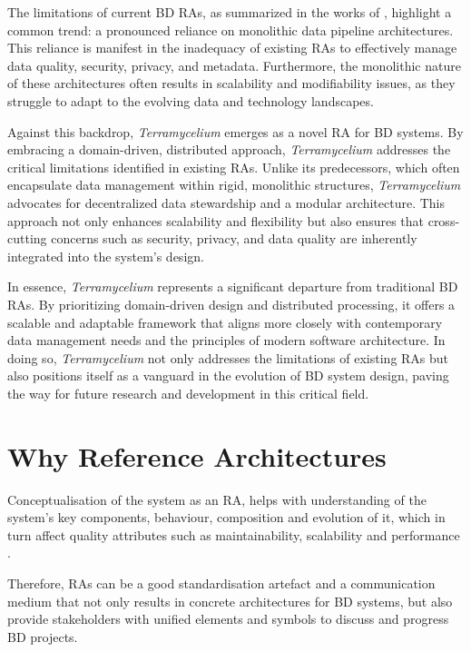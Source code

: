 \documentclass[preprint,12pt]{elsarticle}
\begin{document}
The limitations of current BD RAs, as summarized in the works of \citeauthor{ataei2022state}, highlight a common trend: a pronounced reliance on monolithic data pipeline architectures. This reliance is manifest in the inadequacy of existing RAs to effectively manage data quality, security, privacy, and metadata. Furthermore, the monolithic nature of these architectures often results in scalability and modifiability issues, as they struggle to adapt to the evolving data and technology landscapes.

Against this backdrop, \textit{Terramycelium} emerges as a novel RA for BD systems. By embracing a domain-driven, distributed approach, \textit{Terramycelium} addresses the critical limitations identified in existing RAs. Unlike its predecessors, which often encapsulate data management within rigid, monolithic structures, \textit{Terramycelium} advocates for decentralized data stewardship and a modular architecture. This approach not only enhances scalability and flexibility but also ensures that cross-cutting concerns such as security, privacy, and data quality are inherently integrated into the system's design.

In essence, \textit{Terramycelium} represents a significant departure from traditional BD RAs. By prioritizing domain-driven design and distributed processing, it offers a scalable and adaptable framework that aligns more closely with contemporary data management needs and the principles of modern software architecture. In doing so, \textit{Terramycelium} not only addresses the limitations of existing RAs but also positions itself as a vanguard in the evolution of BD system design, paving the way for future research and development in this critical field.

\section{Why Reference Architectures}
\label{sec:why_reference_architectures}

Conceptualisation of the system as an RA, helps with understanding of the system’s key components, behaviour, composition and evolution of it, which in turn affect quality attributes such as maintainability, scalability and performance \cite{Cloutier}. 

Therefore, RAs can be a good standardisation artefact and a communication medium that not only results in concrete architectures for BD systems, but also provide stakeholders with unified elements and symbols to discuss and progress BD projects.
\end{document}

